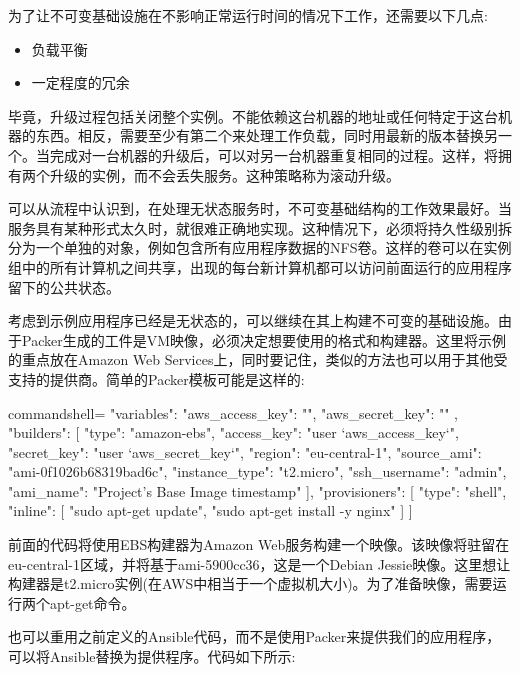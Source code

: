 为了让不可变基础设施在不影响正常运行时间的情况下工作，还需要以下几点:

\begin{itemize}
\item 
负载平衡

\item 
一定程度的冗余
\end{itemize}

毕竟，升级过程包括关闭整个实例。不能依赖这台机器的地址或任何特定于这台机器的东西。相反，需要至少有第二个来处理工作负载，同时用最新的版本替换另一个。当完成对一台机器的升级后，可以对另一台机器重复相同的过程。这样，将拥有两个升级的实例，而不会丢失服务。这种策略称为滚动升级。

可以从流程中认识到，在处理无状态服务时，不可变基础结构的工作效果最好。当服务具有某种形式太久时，就很难正确地实现。这种情况下，必须将持久性级别拆分为一个单独的对象，例如包含所有应用程序数据的NFS卷。这样的卷可以在实例组中的所有计算机之间共享，出现的每台新计算机都可以访问前面运行的应用程序留下的公共状态。


考虑到示例应用程序已经是无状态的，可以继续在其上构建不可变的基础设施。由于Packer生成的工件是VM映像，必须决定想要使用的格式和构建器。这里将示例的重点放在Amazon Web Services上，同时要记住，类似的方法也可以用于其他受支持的提供商。简单的Packer模板可能是这样的:

\begin{tcblisting}{commandshell={}}
{
  "variables": {
    "aws_access_key": "",
    "aws_secret_key": ""
  },
  "builders": [{
    "type": "amazon-ebs",
    "access_key": "{{user `aws_access_key`}}",
    "secret_key": "{{user `aws_secret_key`}}",
    "region": "eu-central-1",
    "source_ami": "ami-0f1026b68319bad6c",
    "instance_type": "t2.micro",
    "ssh_username": "admin",
    "ami_name": "Project's Base Image {{timestamp}}"
  }],
  "provisioners": [{
    "type": "shell",
    "inline": [
      "sudo apt-get update",
      "sudo apt-get install -y nginx"
    ]
  }]
}
\end{tcblisting}

前面的代码将使用EBS构建器为Amazon Web服务构建一个映像。该映像将驻留在eu-central-1区域，并将基于ami-5900cc36，这是一个Debian Jessie映像。这里想让构建器是t2.micro实例(在AWS中相当于一个虚拟机大小)。为了准备映像，需要运行两个apt-get命令。

也可以重用之前定义的Ansible代码，而不是使用Packer来提供我们的应用程序，可以将Ansible替换为提供程序。代码如下所示:

